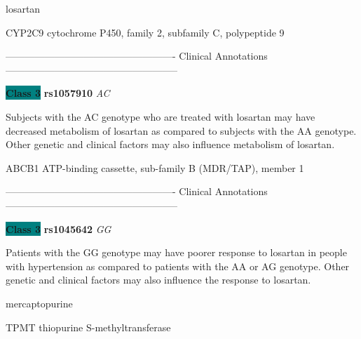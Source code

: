 \documentclass{resume} %
\begin{document}
\begin{rSection}{ losartan }
\begin{rSubsection}{ CYP2C9 }{ cytochrome P450, family 2, subfamily C, polypeptide 9 }{}{}
\item[] ---------------------------------------------------- Clinical Annotations -----------------------------------------------------\newline
\item \textbf{\colorbox{teal} {Class 3}} \textbf{ rs1057910 } \textit{ AC }
\item[] Subjects with the AC genotype who are treated with losartan may have decreased metabolism of losartan as compared to subjects with the AA genotype. Other genetic and clinical factors may also influence metabolism of losartan.
\end{rSubsection}\begin{rSubsection}{ ABCB1 }{ ATP-binding cassette, sub-family B (MDR/TAP), member 1 }{}{}
\item[]

\item[] ---------------------------------------------------- Clinical Annotations -----------------------------------------------------\newline
\item \textbf{\colorbox{teal} {Class 3}} \textbf{ rs1045642 } \textit{ GG }
\item[] Patients with the GG genotype may have poorer response to losartan in people with hypertension as compared to patients with the AA or AG genotype. Other genetic and clinical factors may also influence the response to losartan.
\end{rSubsection}

\end{rSection}\begin{rSection}{ mercaptopurine }
\item[]

\begin{rSubsection}{ TPMT }{ thiopurine S-methyltransferase }{}{}
\item[]


\end{rSubsection}
\end{rSection}
\end{document}
